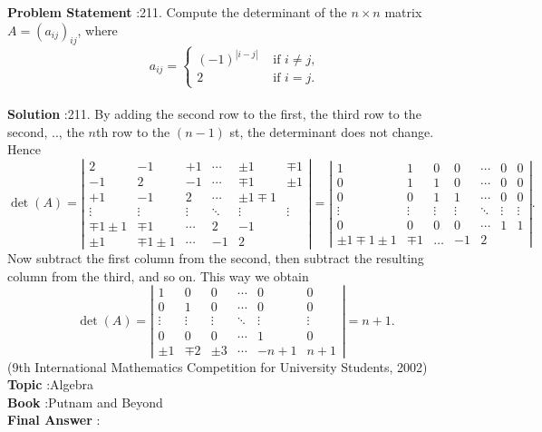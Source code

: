 \documentclass[10pt]{article}
\begin{document}
\textbf{Problem Statement} :211. Compute the determinant of the $n \times n$ matrix $A=\left(a_{i j}\right)_{i j}$, where$$ a_{i j}= \begin{cases}(-1)^{|i-j|} & \text { if } i \neq j, \\ 2 & \text { if } i=j .\end{cases} $$\\
\textbf{Solution} :211. By adding the second row to the first, the third row to the second, .., the $n$th row to the $(n-1)$ st, the determinant does not change. Hence$$ \operatorname{det}(A)=\left|\begin{array}{rrrrrr} 2 & -1 & +1 & \cdots & \pm 1 & \mp 1 \\ -1 & 2 & -1 & \cdots & \mp 1 & \pm 1 \\ +1 & -1 & 2 & \cdots & \pm 1 \mp 1 \\ \vdots & \vdots & \vdots & \ddots & \vdots & \vdots \\ \mp 1 \pm 1 & \mp 1 & \cdots & 2 & -1 \\ \pm 1 & \mp 1 \pm 1 & \cdots & -1 & 2 \end{array}\right|=\left|\begin{array}{ccccccc} 1 & 1 & 0 & 0 & \cdots & 0 & 0 \\ 0 & 1 & 1 & 0 & \cdots & 0 & 0 \\ 0 & 0 & 1 & 1 & \cdots & 0 & 0 \\ \vdots & \vdots & \vdots & \vdots & \ddots & \vdots & \vdots \\ 0 & 0 & 0 & 0 & \cdots & 1 & 1 \\ \pm 1 \mp 1 \pm 1 & \mp 1 & \ldots & -1 & 2 \end{array}\right| . $$Now subtract the first column from the second, then subtract the resulting column from the third, and so on. This way we obtain $$ \operatorname{det}(A)=\left|\begin{array}{cccccc} 1 & 0 & 0 & \cdots & 0 & 0 \\ 0 & 1 & 0 & \cdots & 0 & 0 \\ \vdots & \vdots & \vdots & \ddots & \vdots & \vdots \\ 0 & 0 & 0 & \cdots & 1 & 0 \\ \pm 1 & \mp 2 & \pm 3 & \cdots & -n+1 & n+1 \end{array}\right|=n+1 . $$(9th International Mathematics Competition for University Students, 2002)\\
\textbf{Topic} :Algebra\\
\textbf{Book} :Putnam and Beyond\\
\textbf{Final Answer} :\\
\end{document}
